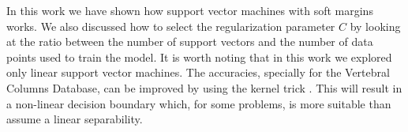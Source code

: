 \label{sec:conclusion}

In this work we have shown how support vector machines with soft margins works.
We also discussed how to select the regularization parameter $C$ by looking at the ratio between the number of support vectors and the number of data points used to train the model.
It is worth noting that in this work we explored only linear support vector machines.
The accuracies, specially for the Vertebral Columns Database, can be improved by using the kernel trick \cite{bishop2006pattern}.
This will result in a non-linear decision boundary which, for some problems, is more suitable than assume a linear separability.






